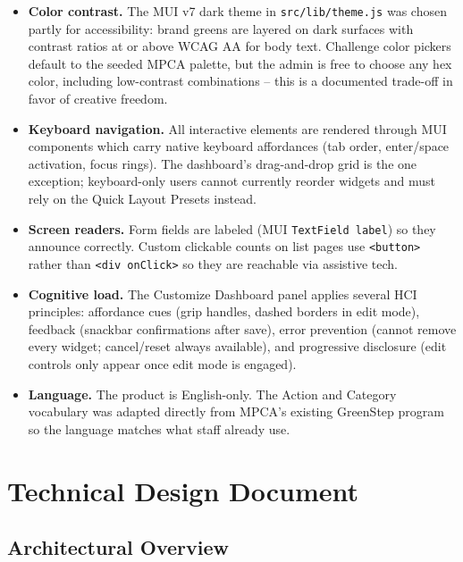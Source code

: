 \documentclass[11pt,letterpaper]{article}
\begin{document}
\begin{itemize}
  \item \textbf{Color contrast.} The MUI v7 dark theme in
        \texttt{src/lib/theme.js} was chosen partly for accessibility:
        brand greens are layered on dark surfaces with contrast
        ratios at or above WCAG AA for body text. Challenge color
        pickers default to the seeded MPCA palette, but the admin
        is free to choose any hex color, including low-contrast
        combinations -- this is a documented trade-off in favor of
        creative freedom.
  \item \textbf{Keyboard navigation.} All interactive elements are
        rendered through MUI components which carry native keyboard
        affordances (tab order, enter/space activation, focus
        rings). The dashboard's drag-and-drop grid is the one
        exception; keyboard-only users cannot currently reorder
        widgets and must rely on the Quick Layout Presets instead.
  \item \textbf{Screen readers.} Form fields are labeled (MUI
        \texttt{TextField label}) so they announce correctly. Custom
        clickable counts on list pages use \texttt{<button>} rather
        than \texttt{<div onClick>} so they are reachable via
        assistive tech.
  \item \textbf{Cognitive load.} The Customize Dashboard panel
        applies several HCI principles: affordance cues (grip
        handles, dashed borders in edit mode), feedback (snackbar
        confirmations after save), error prevention (cannot remove
        every widget; cancel/reset always available), and
        progressive disclosure (edit controls only appear once
        edit mode is engaged).
  \item \textbf{Language.} The product is English-only. The
        Action and Category vocabulary was adapted directly from
        MPCA's existing GreenStep program so the language matches
        what staff already use.
\end{itemize}

\newpage

\section{Technical Design Document}

\subsection{Architectural Overview}
\end{document}
